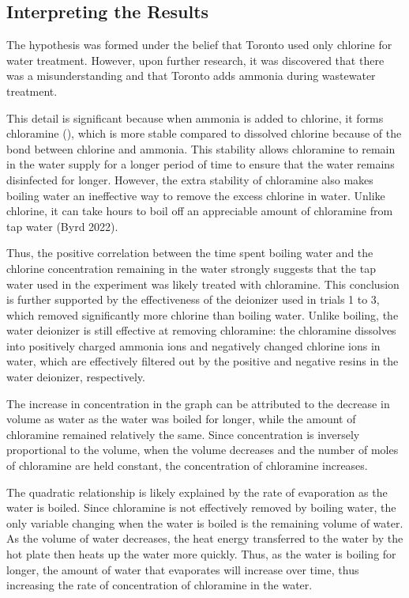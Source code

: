\documentclass[11pt]{article}
\begin{document}
\subsection{Interpreting the Results}

The hypothesis was formed under the belief that Toronto used only chlorine for water treatment. However, upon further research, it was discovered that there was a misunderstanding and that Toronto adds ammonia during wastewater treatment.

This detail is significant because when ammonia is added to chlorine, it forms chloramine (), which is more stable compared to dissolved chlorine because of the bond between chlorine and ammonia. This stability allows chloramine to remain in the water supply for a longer period of time to ensure that the water remains disinfected for longer. However, the extra stability of chloramine also makes boiling water an ineffective way to remove the excess chlorine in water. Unlike chlorine, it can take hours to boil off an appreciable amount of chloramine from tap water (Byrd 2022).

Thus, the positive correlation between the time spent boiling water and the chlorine concentration remaining in the water strongly suggests that the tap water used in the experiment was likely treated with chloramine. This conclusion is further supported by the effectiveness of the deionizer used in trials 1 to 3, which removed significantly more chlorine than boiling water. Unlike boiling, the water deionizer is still effective at removing chloramine: the chloramine dissolves into positively charged ammonia ions and negatively changed chlorine ions in water, which are effectively filtered out by the positive and negative resins in the water deionizer, respectively.

The increase in concentration in the graph can be attributed to the decrease in volume as water as the water was boiled for longer, while the amount of chloramine remained relatively the same. Since concentration is inversely proportional to the volume, when the volume decreases and the number of moles of chloramine are held constant, the concentration of chloramine increases.

The quadratic relationship is likely explained by the rate of evaporation as the water is boiled. Since chloramine is not effectively removed by boiling water, the only variable changing when the water is boiled is the remaining volume of water. As the volume of water decreases, the heat energy transferred to the water by the hot plate then heats up the water more quickly. Thus, as the water is boiling for longer, the amount of water that evaporates will increase over time, thus increasing the rate of concentration of chloramine in the water.
\end{document}
